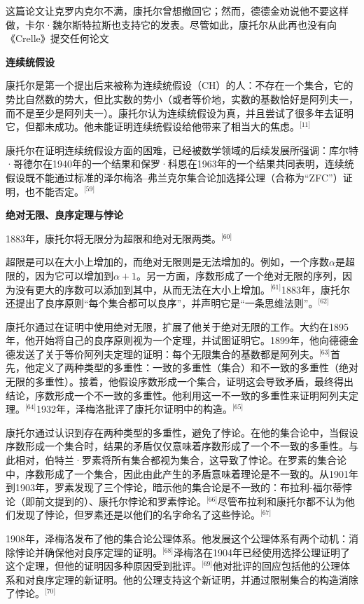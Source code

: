这篇论文让克罗内克尔不满，康托尔曾想撤回它；然而，德德金劝说他不要这样做，卡尔·魏尔斯特拉斯也支持它的发表。尽管如此，康托尔从此再也没有向《Crelle》提交任何论文

\textbf{连续统假设}

康托尔是第一个提出后来被称为连续统假设（CH）的人：不存在一个集合，它的势比自然数的势大，但比实数的势小（或者等价地，实数的基数恰好是阿列夫一，而不是至少是阿列夫一）。康托尔认为连续统假设为真，并且尝试了很多年去证明它，但都未成功。他未能证明连续统假设给他带来了相当大的焦虑。\(^\text{[11]}\)

康托尔在证明连续统假设方面的困难，已经被数学领域的后续发展所强调：库尔特·哥德尔在1940年的一个结果和保罗·科恩在1963年的一个结果共同表明，连续统假设既不能通过标准的泽尔梅洛–弗兰克尔集合论加选择公理（合称为“ZFC”）证明，也不能否定。\(^\text{[59]}\)

\textbf{绝对无限、良序定理与悖论}

1883年，康托尔将无限分为超限和绝对无限两类。\(^\text{[60]}\)

超限是可以在大小上增加的，而绝对无限则是无法增加的。例如，一个序数\(\alpha\)是超限的，因为它可以增加到\(\alpha+1\)。另一方面，序数形成了一个绝对无限的序列，因为没有更大的序数可以添加到其中，从而无法在大小上增加。\(^\text{[61]}\)1883年，康托尔还提出了良序原则“每个集合都可以良序”，并声明它是“一条思维法则”。\(^\text{[62]}\)

康托尔通过在证明中使用绝对无限，扩展了他关于绝对无限的工作。大约在1895年，他开始将自己的良序原则视为一个定理，并试图证明它。1899年，他向德德金德发送了关于等价阿列夫定理的证明：每个无限集合的基数都是阿列夫。\(^\text{[63]}\)首先，他定义了两种类型的多重性：一致的多重性（集合）和不一致的多重性（绝对无限的多重性）。接着，他假设序数形成一个集合，证明这会导致矛盾，最终得出结论，序数形成一个不一致的多重性。他利用这一不一致的多重性来证明阿列夫定理。\(^\text{[64]}\)1932年，泽梅洛批评了康托尔证明中的构造。\(^\text{[65]}\)

康托尔通过认识到存在两种类型的多重性，避免了悖论。在他的集合论中，当假设序数形成一个集合时，结果的矛盾仅仅意味着序数形成了一个不一致的多重性。与此相对，伯特兰·罗素将所有集合都视为集合，这导致了悖论。在罗素的集合论中，序数形成了一个集合，因此由此产生的矛盾意味着理论是不一致的。从1901年到1903年，罗素发现了三个悖论，暗示他的集合论是不一致的：布拉利-福尔蒂悖论（即前文提到的）、康托尔悖论和罗素悖论。\(^\text{[66]}\)尽管布拉利和康托尔都不认为他们发现了悖论，但罗素还是以他们的名字命名了这些悖论。\(^\text{[67]}\)

1908年，泽梅洛发布了他的集合论公理体系。他发展这个公理体系有两个动机：消除悖论并确保他对良序定理的证明。\(^\text{[68]}\)泽梅洛在1904年已经使用选择公理证明了这个定理，但他的证明因多种原因受到批评。\(^\text{[69]}\)他对批评的回应包括他的公理体系和对良序定理的新证明。他的公理支持这个新证明，并通过限制集合的构造消除了悖论。\(^\text{[70]}\)

